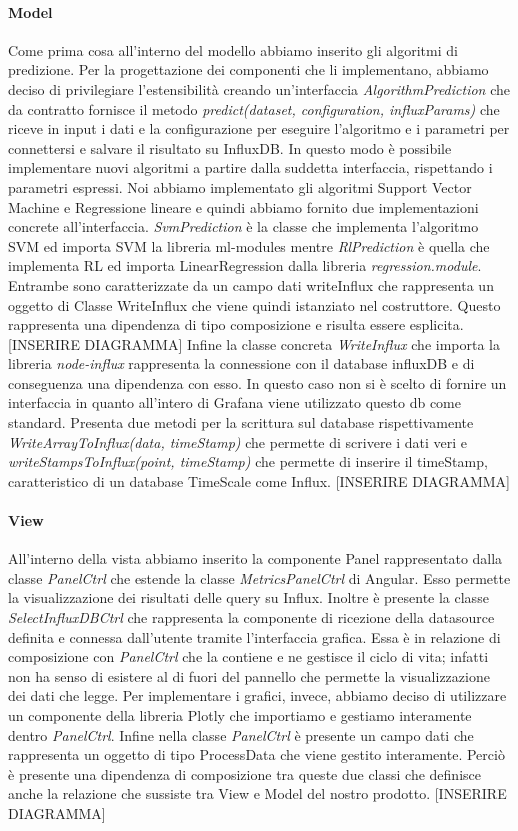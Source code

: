 			\paragraph{Model}
			Come prima cosa all'interno del modello abbiamo inserito gli algoritmi di predizione. Per la progettazione dei componenti che li implementano, abbiamo deciso di privilegiare l'estensibilità creando un'interfaccia \textit{AlgorithmPrediction} che da contratto fornisce il metodo \textit{predict(dataset, configuration, influxParams)} che riceve in input i dati e la configurazione per eseguire l'algoritmo e i parametri per connettersi e salvare il risultato su InfluxDB.
			In questo modo è possibile implementare nuovi algoritmi a partire dalla suddetta interfaccia, rispettando i parametri espressi. Noi abbiamo implementato gli algoritmi Support Vector Machine e Regressione lineare e quindi abbiamo fornito due implementazioni concrete all'interfaccia.
			\textit{SvmPrediction} è la classe che implementa l'algoritmo SVM ed importa SVM la libreria ml-modules mentre \textit{RlPrediction} è quella che implementa RL ed importa LinearRegression dalla libreria \textit{regression.module}. Entrambe sono caratterizzate da un campo dati writeInflux che rappresenta un oggetto di Classe WriteInflux che viene quindi istanziato nel costruttore. Questo rappresenta una dipendenza di tipo composizione e risulta essere esplicita. [INSERIRE DIAGRAMMA]
			Infine la classe concreta \textit{WriteInflux} che importa la libreria \textit{node-influx} rappresenta la connessione con il database influxDB e di conseguenza una dipendenza con esso. In questo caso non si è scelto di fornire un interfaccia in quanto all'intero di Grafana viene utilizzato questo db come standard. Presenta due metodi per la scrittura sul database rispettivamente \textit{WriteArrayToInflux(data, timeStamp)} che permette di scrivere i dati veri e \textit{writeStampsToInflux(point, timeStamp)} che permette di inserire il timeStamp, caratteristico di un database TimeScale come Influx. [INSERIRE DIAGRAMMA]
			\paragraph{View}
			All'interno della vista abbiamo inserito la componente Panel rappresentato dalla classe \textit{PanelCtrl} che estende la classe \textit{MetricsPanelCtrl} di Angular. Esso permette la visualizzazione dei risultati delle query su Influx.
			Inoltre è presente la classe \textit{SelectInfluxDBCtrl} che rappresenta la componente di ricezione della datasource definita e connessa dall'utente tramite l'interfaccia grafica. Essa è in relazione di composizione con \textit{PanelCtrl} che la contiene e ne gestisce il ciclo di vita; infatti non ha senso di esistere al di fuori del pannello che permette la visualizzazione dei dati che legge.
			Per implementare i grafici, invece, abbiamo deciso di utilizzare un componente della libreria Plotly che importiamo e gestiamo interamente dentro \textit{PanelCtrl}.
			Infine nella classe \textit{PanelCtrl} è presente un campo dati che rappresenta un oggetto di tipo ProcessData che viene gestito interamente. Perciò è presente una dipendenza di composizione tra queste due classi che definisce anche la relazione che sussiste tra View e Model del nostro prodotto. [INSERIRE DIAGRAMMA]
